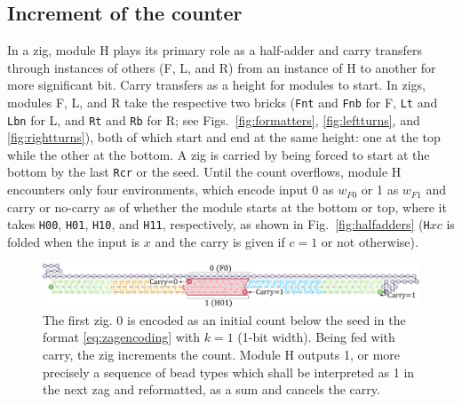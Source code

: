 \documentclass[twocolumn]{svjour3}
\begin{document}
\subsection{Increment of the counter}
In a zig, module H plays its primary role as a half-adder and carry transfers through instances of others (F, L, and R) from an instance of H to another for more significant bit.
Carry transfers as a height for modules to start.
In zigs, modules F, L, and R take the respective two bricks (\texttt{Fnt} and \texttt{Fnb} for F, \texttt{Lt} and \texttt{Lbn} for L, and \texttt{Rt} and \texttt{Rb} for R; see Figs.~\ref{fig:formatters}, \ref{fig:leftturns}, and \ref{fig:rightturns}), both of which start and end at the same height: one at the top while the other at the bottom.
A zig is carried by being forced to start at the bottom by the last \texttt{Rcr} or the seed.
Until the count overflows, module H encounters only four environments, which encode input 0 as $w_{F0}$ or 1 as $w_{F1}$ and carry or no-carry as of whether the module starts at the bottom or top, where it takes \texttt{H00}, \texttt{H01}, \texttt{H10}, and \texttt{H11}, respectively, as shown in Fig.~\ref{fig:halfadders} (\texttt{H}$xc$ is folded when the input is $x$ and the carry is given if $c=1$ or not otherwise).

\begin{figure}[tb]
\centering
\includegraphics[width=0.9\linewidth]{fig/svg/CounterEx5_1.pdf}
\caption{
The first zig.
0 is encoded as an initial count below the seed in the format \eqref{eq:zagencoding} with $k = 1$ (1-bit width).
Being fed with carry, the zig increments the count.
Module H outputs 1, or more precisely a sequence of bead types which shall be interpreted as 1 in the next zag and reformatted, as a sum and cancels the carry.
}

\label{fig:counter1stzig}
\end{figure}
\end{document}
